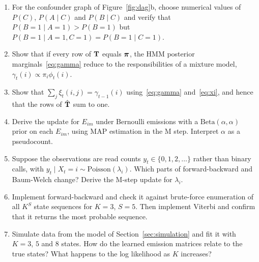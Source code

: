 \begin{enumerate}
  \item For the confounder graph of Figure~\ref{fig:dag}b, choose numerical values of $P(C)$, $P(A\mid C)$ and $P(B\mid C)$ and verify that $P(B=1\mid A=1)>P(B=1)$ but $P(B=1\mid A=1,C=1)=P(B=1\mid C=1)$.
  \item Show that if every row of $\mathbf{T}$ equals $\boldsymbol{\pi}$, the HMM posterior marginals~\eqref{eq:gamma} reduce to the responsibilities of a mixture model, $\gamma_t(i)\propto\pi_i\phi_t(i)$.
  \item Show that $\sum_{j}\xi_t(i,j)=\gamma_{t-1}(i)$ using~\eqref{eq:gamma} and~\eqref{eq:xi}, and hence that the rows of $\hat{\mathbf{T}}$ sum to one.
  \item Derive the update for $E_{im}$ under Bernoulli emissions with a $\text{Beta}(\alpha,\alpha)$ prior on each $E_{im}$, using MAP estimation in the M step. Interpret $\alpha$ as a pseudocount.
  \item Suppose the observations are read counts $y_t\in\{0,1,2,\dots\}$ rather than binary calls, with $y_t\mid X_t=i\sim\text{Poisson}(\lambda_i)$. Which parts of forward-backward and Baum-Welch change? Derive the M-step update for $\lambda_i$.
  \item Implement forward-backward and check it against brute-force enumeration of all $K^S$ state sequences for $K=3$, $S=5$. Then implement Viterbi and confirm that it returns the most probable sequence.
  \item Simulate data from the model of Section~\ref{sec:simulation} and fit it with $K=3$, $5$ and $8$ states. How do the learned emission matrices relate to the true states? What happens to the log likelihood as $K$ increases?
\end{enumerate}
